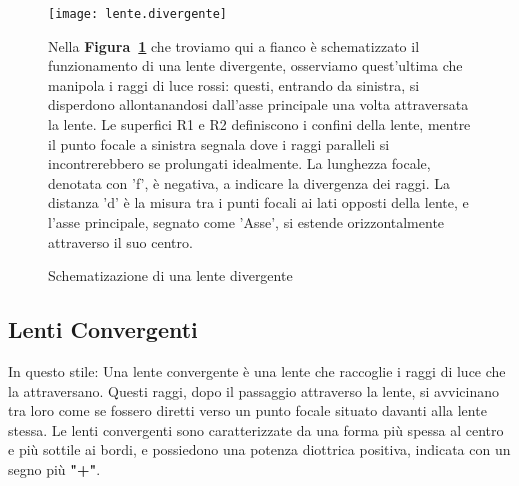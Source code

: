 \documentclass{article}
\begin{document}
\vspace{0.5cm}

\begin{figure}[htbp]
	\begin{minipage}{0.55 \textwidth}
		\centering
		\texttt{[image: lente.divergente]}
		\caption{Schematizazione di una lente divergente}	
		\label{fig:l.d}
	\end{minipage}
\hfill	
	\begin{minipage}{0.40 \textwidth}
		Nella \textbf{Figura~\ref{fig:l.d}} che troviamo qui a fianco è schematizzato il funzionamento di una  lente divergente, osserviamo quest'ultima che manipola i raggi di luce rossi: questi, entrando da sinistra, si disperdono allontanandosi dall'asse principale una volta attraversata la lente. Le superfici R1 e R2 definiscono i confini della lente, mentre il punto focale a sinistra segnala dove i raggi paralleli si incontrerebbero se prolungati idealmente. La lunghezza focale, denotata con 'f', è negativa, a indicare la divergenza dei raggi. La distanza 'd' è la misura tra i punti focali ai lati opposti della lente, e l'asse principale, segnato come 'Asse', si estende orizzontalmente attraverso il suo centro.
	\end{minipage}
	
\end{figure}

\pagebreak

\subsection*{Lenti Convergenti}
In questo stile: Una lente convergente è una lente che raccoglie i raggi di luce che la attraversano. Questi raggi, dopo il passaggio attraverso la lente, si avvicinano tra loro come se fossero diretti verso un punto focale situato davanti alla lente stessa. Le lenti convergenti sono caratterizzate da una forma più spessa al centro e più sottile ai bordi, e possiedono una potenza diottrica positiva, indicata con un segno più \textbf{"+"}.
\vspace{0.5cm}
\end{document}
